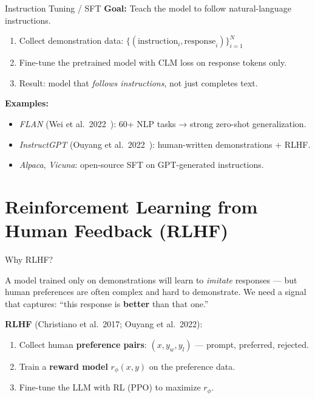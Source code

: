 \documentclass[aspectratio=169,10pt]{beamer}
\begin{document}
\begin{frame}{Instruction Tuning / SFT}
  \textbf{Goal:} Teach the model to follow natural-language instructions.
  \vspace{0.4em}
  \begin{tcolorbox}[hitbox, title=SFT Procedure]
    \begin{enumerate}
      \item Collect demonstration data: $\{(\text{instruction}_i, \text{response}_i)\}_{i=1}^N$
      \item Fine-tune the pretrained model with CLM loss on response tokens only.
      \item Result: model that \emph{follows instructions}, not just completes text.
    \end{enumerate}
  \end{tcolorbox}
  \vspace{0.4em}
  \textbf{Examples:}
  \begin{itemize}
    \item \textit{FLAN} (Wei et al.\ 2022~\cite{wei2022finetuned}): 60+ NLP tasks → strong zero-shot generalization.
    \item \textit{InstructGPT} (Ouyang et al.\ 2022~\cite{ouyang2022training}): human-written demonstrations + RLHF.
    \item \textit{Alpaca}, \textit{Vicuna}: open-source SFT on GPT-generated instructions.
  \end{itemize}
\end{frame}

\section{Reinforcement Learning from Human Feedback (RLHF)}

\begin{frame}{Why RLHF?}
  \begin{tcolorbox}[alertbox, title=Problem with SFT Alone]
    A model trained only on demonstrations will learn to \emph{imitate} responses —
    but human preferences are often complex and hard to demonstrate.
    We need a signal that captures: ``this response is \textbf{better} than that one.''
  \end{tcolorbox}
  \vspace{0.5em}
  \textbf{RLHF} (Christiano et al.\ 2017; Ouyang et al.\ 2022):
  \begin{enumerate}
    \item Collect human \textbf{preference pairs}: $(x, y_w, y_l)$ — prompt, preferred, rejected.
    \item Train a \textbf{reward model} $r_\phi(x, y)$ on the preference data.
    \item Fine-tune the LLM with RL (PPO) to maximize $r_\phi$.
  \end{enumerate}
  \vspace{0.3em}
  
\end{frame}
\end{document}
